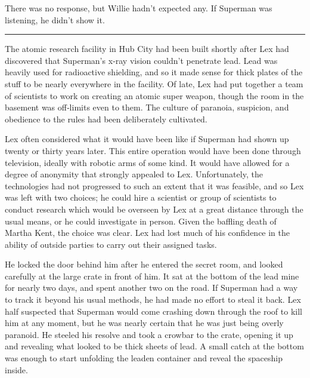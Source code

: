 \documentclass[ebook,12pt]{memoir}
\begin{document}
There was no response, but Willie hadn't expected any. If Superman was
listening, he didn't show it.

\begin{center}\rule{0.5\linewidth}{0.5pt}\end{center}

The atomic research facility in Hub City had been built shortly after
Lex had discovered that Superman's x‐ray vision couldn't penetrate lead.
Lead was heavily used for radioactive shielding, and so it made sense
for thick plates of the stuff to be nearly everywhere in the facility.
Of late, Lex had put together a team of scientists to work on creating
an atomic super weapon, though the room in the basement was off‐limits
even to them. The culture of paranoia, suspicion, and obedience to the
rules had been deliberately cultivated.

Lex often considered what it would have been like if Superman had shown
up twenty or thirty years later. This entire operation would have been
done through television, ideally with robotic arms of some kind. It
would have allowed for a degree of anonymity that strongly appealed to
Lex. Unfortunately, the technologies had not progressed to such an
extent that it was feasible, and so Lex was left with two choices; he
could hire a scientist or group of scientists to conduct research which
would be overseen by Lex at a great distance through the usual means, or
he could investigate in person. Given the baffling death of Martha Kent,
the choice was clear. Lex had lost much of his confidence in the ability
of outside parties to carry out their assigned tasks.

He locked the door behind him after he entered the secret room, and
looked carefully at the large crate in front of him. It sat at the
bottom of the lead mine for nearly two days, and spent another two on
the road. If Superman had a way to track it beyond his usual methods, he
had made no effort to steal it back. Lex half suspected that Superman
would come crashing down through the roof to kill him at any moment, but
he was nearly certain that he was just being overly paranoid. He steeled
his resolve and took a crowbar to the crate, opening it up and revealing
what looked to be thick sheets of lead. A small catch at the bottom was
enough to start unfolding the leaden container and reveal the spaceship
inside.
\end{document}
